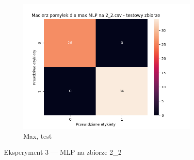 \documentclass[12pt]{article}
\newcommand*{\subfigwidth}{0.24\textwidth}
\begin{document}
\begin{figure}[H]
\begin{subfigure}[t]{\subfigwidth}
        \includegraphics[width=\linewidth]{img/exp_3/mlp/2_2/max/test_matrix.png}
        \caption{Max, test}
    \end{subfigure}

    \caption{Eksperyment 3 --- MLP na zbiorze 2\_2}
\end{figure}
\end{document}

